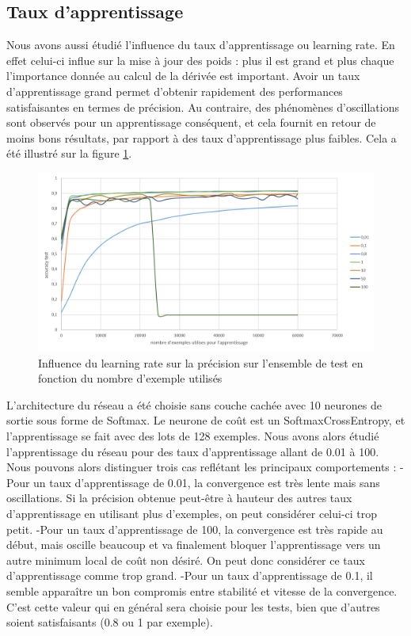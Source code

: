 \documentclass{report}
\begin{document}
\subsection{Taux d'apprentissage}
Nous avons aussi étudié l'influence du taux d'apprentissage ou learning rate. En effet celui-ci influe sur la mise à jour des poids : plus il est grand et plus chaque l'importance donnée au calcul de la dérivée est important. Avoir un taux d'apprentissage grand permet d’obtenir rapidement des performances satisfaisantes en termes de précision. Au contraire, des phénomènes d'oscillations sont observés pour un apprentissage conséquent, et cela fournit en retour de moins bons résultats, par rapport à des taux d'apprentissage plus faibles. Cela a été illustré sur la figure \ref{influence_learningrate}.

\begin{figure}[!h]
\begin{center}
\includegraphics[scale=0.6]{images/influence_learningrate.png}
\caption{Influence du learning rate sur la précision sur l'ensemble de test en fonction du nombre d'exemple utilisés}
\label{influence_learningrate}
\end{center}
\end{figure}

L'architecture du réseau a été choisie sans couche cachée avec 10 neurones de sortie sous forme de Softmax. Le neurone de coût est un SoftmaxCrossEntropy, et l'apprentissage se fait avec des lots de 128 exemples. Nous avons alors étudié l'apprentissage du réseau pour des taux d'apprentissage allant de 0.01 à 100.
Nous pouvons alors distinguer trois cas reflétant les principaux comportements :
	-Pour un taux d'apprentissage de 0.01, la convergence est très lente mais sans oscillations. Si la précision obtenue peut-être à hauteur des autres taux d'apprentissage en utilisant plus d'exemples, on peut considérer celui-ci trop petit.
	-Pour un taux d'apprentissage de 100, la convergence est très rapide au début, mais oscille beaucoup et va finalement bloquer l'apprentissage vers un autre minimum local de coût non désiré. On peut donc considérer ce taux d'apprentissage comme trop grand.
	-Pour un taux d'apprentissage de 0.1, il semble apparaître un bon compromis entre stabilité et vitesse de la convergence. C'est cette valeur qui en général sera choisie pour les tests, bien que d'autres soient satisfaisants (0.8 ou 1 par exemple).
\end{document}
